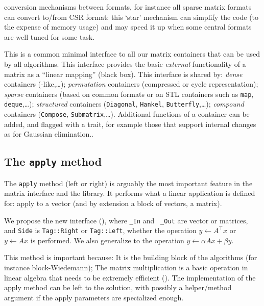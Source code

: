%
	 conversion mechanisms between formats, for instance all
	 sparse matrix formats can convert to/from CSR format:  this `star'
	 mechanism can simplify the code (to the expense of memory usage) and
	 may speed it up when some central formats  are
	 well tuned for some task.
%
	 \par
%
This is a common minimal interface to all our matrix containers that can be
used by all algorithms.
This interface provides the basic {\em external}
functionality of a matrix as a
 ``linear mapping'' (black box).
This interface is shared by: \emph{dense}
containers (\blas-like,\ldots); \emph{permutation} containers (compressed
 or cycle representation); \emph{sparse} containers (based on
common formats or on STL containers such as {\tt map}, {\tt deque},\ldots);
\emph{structured} containers ({\tt Diagonal}, {\tt Hankel}, {\tt Butterfly},\ldots);
\emph{compound} containers ({\tt Compose}, {\tt Submatrix},\ldots).
Additional functions of a container can be added, and flagged with a trait, for example those that support internal changes as for Gaussian elimination..
%
\subsection{The \texttt{apply} method}\label{ssec:apply}
%
%
\par
%
The \texttt{apply} method (left or right) is arguably the most important
feature in the matrix interface and the \linbox library. It performs what a
linear application is defined for: apply to a vector (and by extension  a block
of vectors, \ie a matrix).
%
\par
%
We propose the new interface (), where {\tt \_In} and {\tt
\_Out} are vector or matrices, and {\tt Side} is {\tt Tag::Right} or
{\tt Tag::Left}, whether the operation $y \gets A^{\top} x$ or  $y \gets A x$ is
performed. We also generalize to the operation $y \gets \alpha A x + \beta y$.
%

%
This method is important because: It is the building block of the \applin
algorithms (for instance block-Wiedemann); The matrix multiplication is
a basic operation in linear algebra that needs to be extremely efficient ().
%
%
%
The implementation of the apply method can be left to the \mul solution, with possibly a helper/method argument if the apply
parameters are specialized enough.
%
%
%
